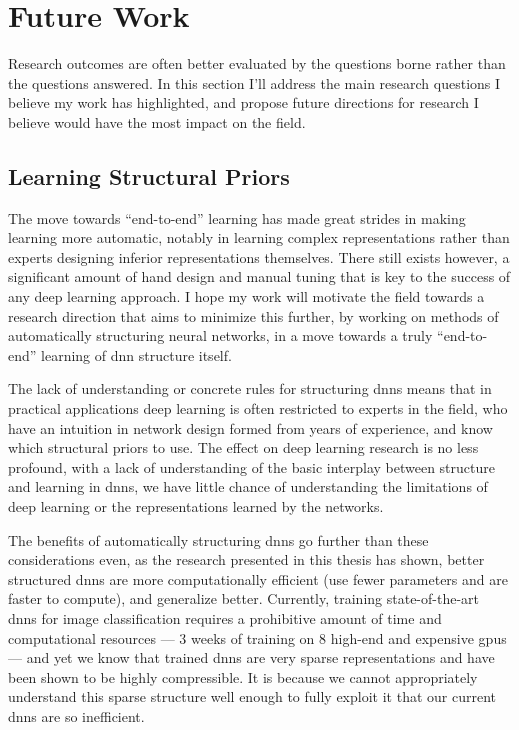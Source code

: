 \documentclass[thesis]{subfiles}
\begin{document}

\chapter{Future Work}  %
\label{futurework}


Research outcomes are often better evaluated by the questions borne rather than the questions answered. In this section I'll address the main research questions I believe my work has highlighted, and propose future directions for research I believe would have the most impact on the field.

\section{Learning Structural Priors}
The move towards ``end-to-end'' learning has made great strides in making learning more automatic, notably in learning complex representations rather than experts designing inferior representations themselves. There still exists however, a significant amount of hand design and manual tuning that is key to the success of any deep learning approach. I hope my work will motivate the field towards a research direction that aims to minimize this further, by working on methods of automatically structuring neural networks, in a move towards a truly ``end-to-end'' learning of \gls{dnn} structure itself.

The lack of understanding or concrete rules for structuring \glspl{dnn} means that in practical applications deep learning is often restricted to experts in the field, who have an intuition in network design formed from years of experience, and know which structural priors to use. The effect on deep learning research is no less profound, with a lack of understanding of the basic interplay between structure and learning in \glspl{dnn}, we have little chance of understanding the limitations of deep learning or the representations learned by the networks. 

The benefits of automatically structuring \glspl{dnn} go further than these considerations even, as the research presented in this thesis has shown, better structured \glspl{dnn} are more computationally efficient (use fewer parameters and are faster to compute), and generalize better. Currently, training state-of-the-art \glspl{dnn} for image classification requires a prohibitive amount of time and computational resources --- 3 weeks of training on 8 high-end and expensive \glspl{gpu} --- and yet we know that trained \glspl{dnn} are very sparse representations and have been shown to be highly compressible. It is because we cannot appropriately understand this sparse structure well enough to fully exploit it that our current \glspl{dnn} are so inefficient.
\end{document}
